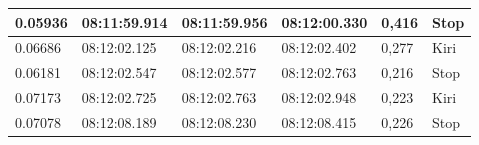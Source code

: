\begin{longtable}{|l|l|l|l|l|l|}
  0.05936                                                                                                 & 08:11:59.914                                                                                           & 08:11:59.956                                                                                               & 08:12:00.330                                                                                            & 0,416                                              & Stop                                              \\ \hline
  0.06686                                                                                                 & 08:12:02.125                                                                                           & 08:12:02.216                                                                                               & 08:12:02.402                                                                                            & 0,277                                              & Kiri                                              \\ \hline
  0.06181                                                                                                 & 08:12:02.547                                                                                           & 08:12:02.577                                                                                               & 08:12:02.763                                                                                            & 0,216                                              & Stop                                              \\ \hline
  0.07173                                                                                                 & 08:12:02.725                                                                                           & 08:12:02.763                                                                                               & 08:12:02.948                                                                                            & 0,223                                              & Kiri                                              \\ \hline
  0.07078                                                                                                 & 08:12:08.189                                                                                           & 08:12:08.230                                                                                               & 08:12:08.415                                                                                            & 0,226                                              & Stop                                              \\ \hline

\end{longtable}
